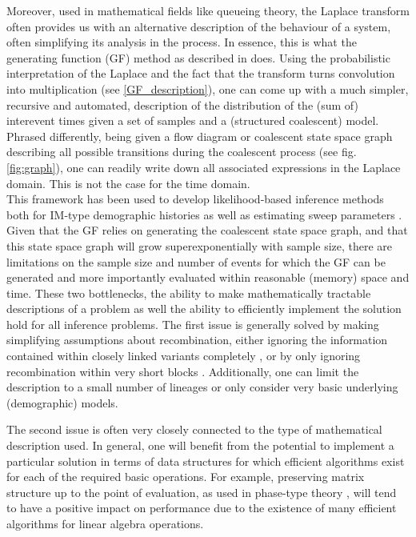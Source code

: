 \documentclass[10pt, a4]{article}
\begin{document}
Moreover, used in mathematical fields like queueing theory, the Laplace transform often provides us with an alternative description of the behaviour of a system, often simplifying its analysis in the process. In essence, this is what the generating function (GF) method as described in \citet{Lohse2011} does. Using the probabilistic interpretation of the Laplace and the fact that the transform turns convolution into multiplication (see \ref{GF_description}), one can come up with a much simpler, recursive and automated, description of the distribution of the (sum of) interevent times given a set of samples and a (structured coalescent) model. Phrased differently, being given a flow diagram or coalescent state space graph describing all possible transitions during the coalescent process (see fig. \ref{fig:graph}), one can readily write down all associated expressions in the Laplace domain. This is not the case for the time domain.\\

This framework has been used to develop likelihood-based inference methods both for IM-type demographic histories \citep{Lohse2011, Bunnefeld2015, Lohse2016} as well as estimating sweep parameters \citep{Bisschop2021}. Given that the GF relies on generating the coalescent state space graph, and that this state space graph will grow superexponentially with sample size, there are limitations on the sample size and number of events for which the GF can be generated and more importantly evaluated within reasonable (memory) space and time. These two bottlenecks, the ability to make mathematically tractable descriptions of a problem as well the ability to efficiently implement the solution hold for all inference problems. The first issue is generally solved by making simplifying assumptions about recombination, either ignoring the information contained within closely linked variants completely \citep{Gutenkunst2009, Excoffier2013}, or by only ignoring recombination within very short blocks \citep{Yang2002, Hey2004}. Additionally, one can limit the description to a small number of lineages or only consider very basic underlying (demographic) models.

The second issue is often very closely connected to the type of mathematical description used. In general, one will benefit from the potential to implement a particular solution in terms of data structures for which efficient algorithms exist for each of the required basic operations. For example, preserving matrix structure up to the point of evaluation, as used in phase-type theory \citep{Hobolth2019}, will tend to have a positive impact on performance due to the existence of many efficient algorithms for linear algebra operations.
\end{document}
